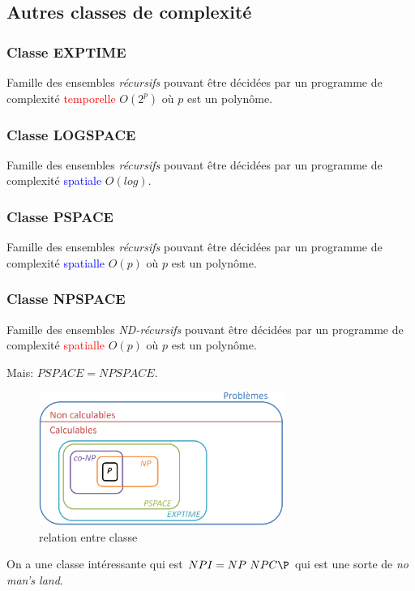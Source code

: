 \documentclass{report}
\begin{document}
\subsection{Autres classes de complexité}

\subsubsection{Classe EXPTIME}
Famille des ensembles \textit{récursifs} pouvant être décidées par un programme de complexité \textcolor{red}{temporelle} $O(2^p)$ où $p$ est un polynôme.

\subsubsection{Classe LOGSPACE}
Famille des ensembles \textit{récursifs} pouvant être décidées par un programme de complexité \textcolor{blue}{spatiale} $O(log)$.

\subsubsection{Classe PSPACE}
Famille des ensembles \textit{récursifs} pouvant être décidées par un programme de complexité \textcolor{blue}{spatialle} $O(p)$ où $p$ est un polynôme.

\subsubsection{Classe NPSPACE}
Famille des ensembles \textit{ND-récursifs} pouvant être décidées par un programme de complexité \textcolor{red}{spatialle} $O(p)$ où $p$ est un polynôme.\par 
Mais: $PSPACE = NPSPACE$.
\begin{figure}[H]
\centering
\includegraphics[width=8cm]{img/classe.png}
\caption{relation entre classe}
\end{figure}

On a une classe intéressante qui est $NPI = NP \ NPC \P$ qui est une sorte de \textit{no man's land}.
\end{document}
